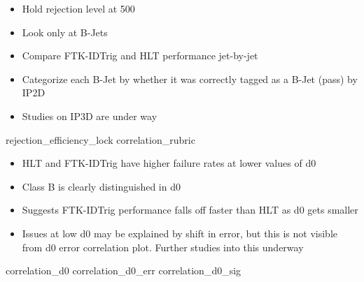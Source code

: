     { \begin{itemize}
        \item Hold rejection level at 500
        \item Look only at B-Jets
        \item Compare FTK-IDTrig and HLT performance jet-by-jet
        \item Categorize each B-Jet by whether it was correctly tagged as a B-Jet (pass) by IP2D
        \item Studies on IP3D are under way
    \end{itemize} }
    {rejection_efficiency_lock}
    {correlation_rubric}

    { \begin{itemize}
        \item HLT and FTK-IDTrig have higher failure rates at lower values of d0
        \item Class B is clearly distinguished in d0
        \item Suggests FTK-IDTrig performance falls off faster than HLT as d0 gets smaller
        \item Issues at low d0 may be explained by shift in error,
            but this is not visible from d0 error correlation plot.
            Further studies into this underway
    \end{itemize} }
    {correlation_d0}
    {correlation_d0_err}
    {correlation_d0_sig}
